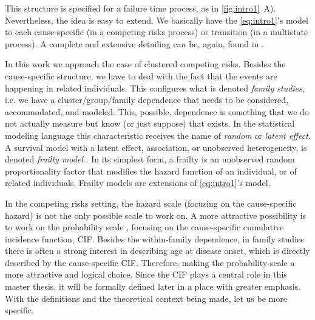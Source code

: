 This structure is specified for a failure time process, as in
\autoref{fig:intro1}~A). Nevertheless, the idea is easy to extend. We
basically have the \autoref{eq:intro1}'s model to each cause-specific
(in a competing risks process) or transition (in a multistate process).
A complete and extensive detailing can be, again, found in
.

In this work we approach the case of clustered competing risks. Besides
the cause-specific structure, we have to deal with the fact that the
events are happening in related individuals. This configures what is
denoted \textit{family studies}, i.e. we have a cluster/group/family
dependence that needs to be considered, accommodated, and modeled. This,
possible, dependence is something that we do not actually measure but
know (or just suppose) that exists. In the statistical modeling language
this characteristic receives the name of \textit{random} or
\textit{latent effect}. A survival model with a latent effect,
association, or unobserved heterogeneity, is denoted
\textit{frailty model} \cite{frailty78, frailty79}. In its simplest
form, a frailty is an unobserved random proportionality factor that
modifies the hazard function of an individual, or of related
individuals. Frailty models are extensions of \autoref{eq:intro1}'s
model.

In the competing risks setting, the hazard scale (focusing on the
cause-specific hazard) is not the only possible scale to work on. A more
attractive possibility is to work on the probability scale
\cite{andersen12}, focusing on the cause-specific cumulative
incidence function, CIF. Besides the within-family dependence, in family
studies there is often a strong interest in describing age at disease
onset, which is directly described by the cause-specific CIF. Therefore,
making the probability scale a more attractive and logical choice. Since
the CIF plays a central role in this master thesis, it will be formally
defined later in a place with greater emphasis. With the definitions and
the theoretical context being made, let us be more specific.

